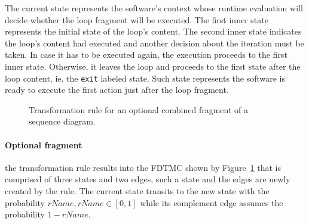 The current state represents the software's context whose runtime evaluation
will decide whether the loop fragment will be executed. The first inner state
represents the initial state of the loop's content. The second inner state
indicates the loop's content had executed and another decision about the
iteration must be taken. In case it has to be executed again, the execution
proceeds to the first inner state. Otherwise, it leaves the loop and proceeds to
the first state after the loop content, ie. the \texttt{exit} labeled state.
Such state represents the software is ready to execute the first action just
after the loop fragment.


\begin{figure}[h!]
\begin{center}
\resizebox{!}{4cm}{

}
\end{center}
\caption{Transformation rule for an optional combined fragment of a sequence
diagram.}
\label{fig:transOptFrag_SD}
\end{figure}

\paragraph{Optional fragment\label{par:optFragTransformation}} 
the transformation rule results into the FDTMC shown by
Figure~\ref{fig:transOptFrag_SD} that is comprised of three states and two
edges, such a state and the edges are newly created by the rule. The current
state transits to the new state with the probability $rName, rName \in [0,1]$
while its complement edge assumes the probability $1-rName$.

